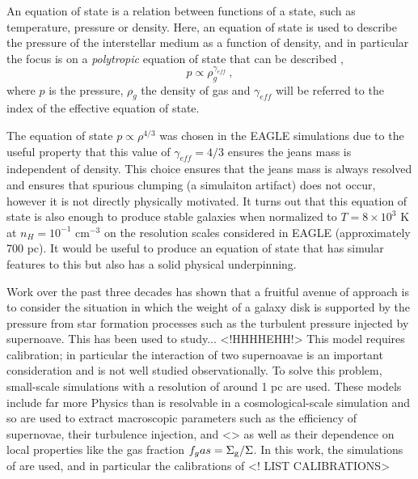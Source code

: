 An equation of state is a relation between functions of a state, such as temperature, pressure or density. 
Here, an equation of state is used to describe the pressure of the interstellar medium as a function of density, and in particular the focus is on a \emph{polytropic} equation of state that can be described \citep{horedt2004},
\begin{equation}
\label{eqn:polytrope}
p \propto \rho_g ^ {\gamma_{eff}}~,
\end{equation}
where $p$ is the pressure, $\rho_g$ the density of gas and $\gamma_{eff}$ will be referred to the index of the effective equation of state.

The equation of state $p \propto \rho^{4/3}$ was chosen in the EAGLE simulations \citep{schaye2015} due to the useful property that this value of $\gamma_{eff} = 4/3$ ensures the jeans mass is independent of density.
This choice ensures that the jeans mass is always resolved and ensures that spurious clumping (a simulaiton artifact) does not occur, however it is not directly physically motivated.
It turns out that this equation of state is also enough to produce stable galaxies when normalized to $T = 8\times 10^3$ K at $n_H = 10^{-1}$ cm$^{-3}$ on the resolution scales considered in EAGLE (approximately 700 pc).
It would be useful to produce an equation of state that has simular features to this but also has a solid physical underpinning.

Work over the past three decades has shown that a fruitful avenue of approach is to consider the situation in which the weight of a galaxy disk is supported by the pressure from star formation processes such as the turbulent pressure injected by supernoave. 
This has been used to study... <!HHHHEHH!>
This model requires calibration; in particular the interaction of two supernoavae is an important consideration and is not well studied observationally.
To solve this problem, small-scale simulations with a resolution of around 1 pc \citep{martizzi2015} are used.
These models include far more Physics than is resolvable in a cosmological-scale simulation and so are used to extract macroscopic parameters such as the efficiency of supernovae, their turbulence injection, and <> as well as their dependence on local properties like the gas fraction $f_gas = \Sigma_\mathrm{g}/\Sigma$.
In this work, the simulations of \citet{martizzi2015} are used, and in particular the calibrations of
<! LIST CALIBRATIONS>
